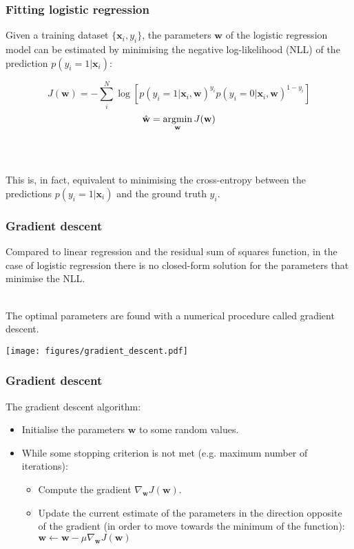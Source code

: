 \documentclass[notes]{beamer}          %
\newcommand{\argmin}{\operatornamewithlimits{argmin}}
\begin{document}
\begin{frame}
\frametitle{Fitting logistic regression}

Given a training dataset $\{\mathbf{x}_i, y_i\}$, the parameters $\mathbf{w}$ of the logistic regression model can be estimated by minimising the negative log-likelihood (NLL) of the prediction $p(y_i = 1 \vert \mathbf{x}_i)$: 

$$ J(\mathbf{w}) = -\sum_{i}^{N} \log \left [ p(y_i = 1 \vert \mathbf{x}_i, \mathbf{w})^{y_i} p(y_i = 0 \vert \mathbf{x}_i, \mathbf{w})^{1-y_i} \right ]$$
$$\hat{\mathbf{w}} =  \argmin_{\mathbf{w}} J(\mathbf{w}) $$ \\~\

This is, in fact, equivalent to minimising the cross-entropy between the predictions  $p(y_i = 1 \vert \mathbf{x}_i)$ and the ground truth $y_i$.

\end{frame}


\begin{frame}
\frametitle{Gradient descent}

Compared to linear regression and the residual sum of squares function, in the case of logistic regression there is no closed-form solution for the parameters that minimise the NLL. \\~\

The optimal parameters are found with a numerical procedure called gradient descent.

\begin{center}
\texttt{[image: figures/gradient\_descent.pdf]} \\
\end{center}
\end{frame}

\begin{frame}
\frametitle{Gradient descent}

The gradient descent algorithm:
\begin{itemize}
  \item Initialise the parameters $\mathbf{w}$ to some random values.
  \item While some stopping criterion is not met (e.g. maximum number of iterations):
  \begin{itemize}
    \item Compute the gradient $\nabla_\mathbf{w} J(\mathbf{w})$.
    \item Update the current estimate of the parameters in the direction opposite of the gradient (in order to move towards the minimum of the function): $\mathbf{w} \leftarrow \mathbf{w} - \mu \nabla_\mathbf{w} J(\mathbf{w})$
  \end{itemize}
  \end{itemize}

\end{frame}
\end{document}
